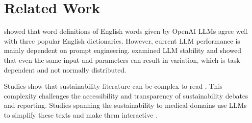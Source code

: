 \section{Related Work}
 showed that word definitions of English words given by OpenAI LLMs agree well with three popular English dictionaries. However, current LLM performance is mainly dependent on prompt engineering.  examined LLM stability and showed that even the same input and parameters can result in variation, which is task-dependent and not normally distributed.

Studies show that sustainability literature can be complex to read \cite{smeuninxMeasuringReadabilitySustainability2020a, barkemeyer_linguistic_2016}. This complexity challenges the accessibility and transparency of sustainability debates and reporting. Studies spanning the sustainability to medical domains use LLMs to simplify these texts and make them interactive \cite{niCHATREPORTDemocratizingSustainability2023, yaoREADMEBridgingMedical2024}.